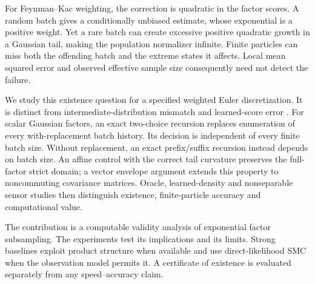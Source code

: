 \documentclass{article}
\begin{document}
For Feynman--Kac weighting, the correction is quadratic in the factor scores. A random batch gives a conditionally unbiased estimate, whose exponential is a positive weight. Yet a rare batch can create excessive positive quadratic growth in a Gaussian tail, making the population normalizer infinite. Finite particles can miss both the offending batch and the extreme states it affects. Local mean squared error and observed effective sample size consequently need not detect the failure.

We study this existence question for a specified weighted Euler discretization. It is distinct from intermediate-distribution mismatch and learned-score error \citep{linhart2026,soiffer2026}. For scalar Gaussian factors, an exact two-choice recursion replaces enumeration of every with-replacement batch history. Its decision is independent of every finite batch size. Without replacement, an exact prefix/suffix recursion instead depends on batch size. An affine control with the correct tail curvature preserves the full-factor strict domain; a vector envelope argument extends this property to noncommuting covariance matrices. Oracle, learned-density and nonseparable sensor studies then distinguish existence, finite-particle accuracy and computational value.

The contribution is a computable validity analysis of exponential factor subsampling. The experiments test its implications and its limits. Strong baselines exploit product structure when available and use direct-likelihood SMC when the observation model permits it. A certificate of existence is evaluated separately from any speed--accuracy claim.
\end{document}
